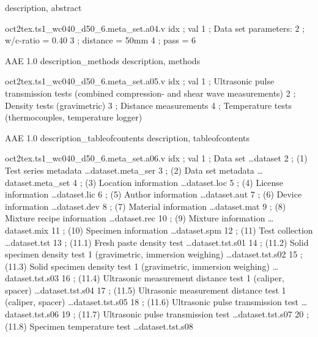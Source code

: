 \expandafter\def\csname oct2tex.ts1_wc040_d50_6.meta_set.a04.d\endcsname{description, abstract}
\begin{filecontents}[overwrite]{oct2tex.ts1_wc040_d50_6.meta_set.a04.v}
idx ; val
1 ; Data set parameters:
2 ; w/c-ratio = 0.40
3 ; distance = 50mm
4 ; pass = 6
\end{filecontents}
\expandafter\def\csname oct2tex.ts1_wc040_d50_6.meta_set.a05.obj\endcsname{AAE}
\expandafter\def\csname oct2tex.ts1_wc040_d50_6.meta_set.a05.ver\endcsname{1.0}
\expandafter\def\csname oct2tex.ts1_wc040_d50_6.meta_set.a05.t\endcsname{description\_methods}
\expandafter\def\csname oct2tex.ts1_wc040_d50_6.meta_set.a05.d\endcsname{description, methods}
\begin{filecontents}[overwrite]{oct2tex.ts1_wc040_d50_6.meta_set.a05.v}
idx ; val
1 ; Ultrasonic pulse transmission tests (combined compression- and shear wave measurements)
2 ; Density tests (gravimetric)
3 ; Distance measurements
4 ; Temperature tests (thermocouples, temperature logger)
\end{filecontents}
\expandafter\def\csname oct2tex.ts1_wc040_d50_6.meta_set.a06.obj\endcsname{AAE}
\expandafter\def\csname oct2tex.ts1_wc040_d50_6.meta_set.a06.ver\endcsname{1.0}
\expandafter\def\csname oct2tex.ts1_wc040_d50_6.meta_set.a06.t\endcsname{description\_tableofcontents}
\expandafter\def\csname oct2tex.ts1_wc040_d50_6.meta_set.a06.d\endcsname{description, tableofcontents}
\begin{filecontents}[overwrite]{oct2tex.ts1_wc040_d50_6.meta_set.a06.v}
idx ; val
1 ; Data set \ldots dataset
2 ; (1) Test series metadata \ldots dataset.meta\_ser
3 ; (2) Data set metadata \ldots dataset.meta\_set
4 ; (3) Location information \ldots dataset.loc
5 ; (4) License information \ldots dataset.lic
6 ; (5) Author information \ldots dataset.aut
7 ; (6) Device information \ldots dataset.dev
8 ; (7) Material information \ldots dataset.mat
9 ; (8) Mixture recipe information \ldots dataset.rec
10 ; (9) Mixture information \ldots dataset.mix
11 ; (10) Specimen information \ldots dataset.spm
12 ; (11) Test collection \ldots dataset.tst
13 ; (11.1) Fresh paste density test \ldots dataset.tst.s01
14 ; (11.2) Solid specimen density test 1 (gravimetric, immersion weighing) \ldots dataset.tst.s02
15 ; (11.3) Solid specimen density test 1 (gravimetric, immersion weighing) \ldots dataset.tst.s03
16 ; (11.4) Ultrasonic measurement distance test 1 (caliper, spacer) \ldots dataset.tst.s04
17 ; (11.5) Ultrasonic measurement distance test 1 (caliper, spacer) \ldots dataset.tst.s05
18 ; (11.6) Ultrasonic pulse transmission test \ldots dataset.tst.s06
19 ; (11.7) Ultrasonic pulse transmission test \ldots dataset.tst.s07
20 ; (11.8) Specimen temperature test \ldots dataset.tst.s08
\end{filecontents}
